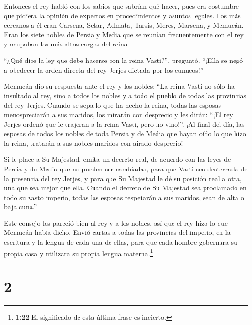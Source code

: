  Entonces el rey habló con los sabios que sabrían qué
hacer, pues era costumbre que pidiera la opinión de expertos en
procedimientos y asuntos legales.  Los más cercanos a él
eran Carsena, Setar, Admata, Tarsis, Meres, Marsena, y Memucán. Eran los
siete nobles de Persia y Media que se reunían frecuentemente con el rey
y ocupaban los más altos cargos del reino.

 ``¿Qué dice la ley que debe hacerse con la reina Vasti?'',
preguntó. ``¡Ella se negó a obedecer la orden directa del rey Jerjes
dictada por los eunucos!''

 Memucán dio su respuesta ante el rey y los nobles: ``La
reina Vasti no sólo ha insultado al rey, sino a todos los nobles y a
todo el pueblo de todas las provincias del rey Jerjes. 
Cuando se sepa lo que ha hecho la reina, todas las esposas
menospreciarán a sus maridos, los mirarán con desprecio y les dirán:
``¡El rey Jerjes ordenó que le trajeran a la reina Vasti, pero no
vino!''.  ¡Al final del día, las esposas de todos los
nobles de toda Persia y de Media que hayan oído lo que hizo la reina,
tratarán a sus nobles maridos con airado desprecio!

 Si le place a Su Majestad, emita un decreto real, de
acuerdo con las leyes de Persia y de Media que no pueden ser cambiadas,
para que Vasti sea desterrada de la presencia del rey Jerjes, y para que
Su Majestad le dé su posición real a otra, una que sea mejor que ella.
 Cuando el decreto de Su Majestad sea proclamado en todo su
vasto imperio, todas las esposas respetarán a sus maridos, sean de alta
o baja cuna.''

 Este consejo les pareció bien al rey y a los nobles, así
que el rey hizo lo que Memucán había dicho.  Envió cartas a
todas las provincias del imperio, en la escritura y la lengua de cada
una de ellas, para que cada hombre gobernara su propia casa y utilizara
su propia lengua materna.\footnote{\textbf{1:22} El significado de esta
  última frase es incierto.}

\hypertarget{section-1}{%
\section{2}\label{section-1}}

